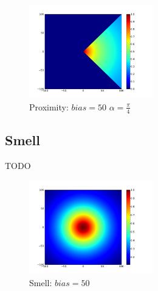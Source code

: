 \documentclass[a4paper]{article}
\begin{document}
\begin{figure}
	\vspace{-30pt}
	\begin{center}
		\includegraphics[width=0.48\textwidth]{graphs/sensors/proximity.png}
	\end{center}
	\vspace{-30pt}
	\caption{Proximity: $bias=50$ $\alpha=\frac{\pi}{4}$}
\end{figure}

\subsection{Smell}
TODO

\begin{figure}
	\vspace{-30pt}
	\begin{center}
		\includegraphics[width=0.48\textwidth]{graphs/sensors/smell.png}
	\end{center}
	\vspace{-30pt}
	\caption{Smell: $bias=50$}
\end{figure}

\cleardoublepage
\end{document}
